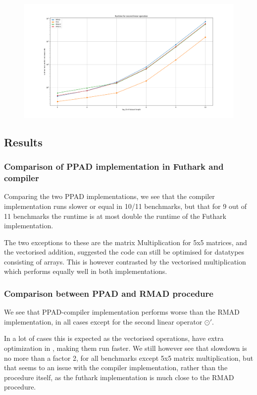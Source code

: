 \documentclass{article}
\begin{document}
\begin{figure}[h]
	\includegraphics[width=\textwidth]{graphofruntime.png}
\end{figure}
\subsection{Results}
\subsubsection*{Comparison of PPAD implementation in Futhark and compiler}
Comparing the two PPAD implementations,
we see that the compiler implementation runs slower or equal in 10/11 benchmarks,
but that for 9 out of 11 benchmarks the runtime is at most double the
runtime of the Futhark implementation.

The two exceptions to these are the matrix Multiplication for 5x5 matrices,
and the vectorised addition,
suggested the code can still be optimised for datatypes consisting of
arrays.
This is however contrasted by the vectorised multiplication which performs
equally well in both implementations.

\subsubsection*{Comparison between PPAD and RMAD procedure}
We see that PPAD-compiler implementation performs worse than the RMAD
implementation, in all cases except for the second linear operator \(\odot'\).

In a lot of cases this is expected as the vectorised operations, have extra
optimization in \cite{Futhark}, making them run faster.
We still however see that slowdown is no more than a factor 2, for all
benchmarks except 5x5 matrix multiplication, but that seems to an issue with
the compiler implementation, rather than the procedure itself, as the
futhark implementation is much close to the RMAD procedure.
\end{document}
